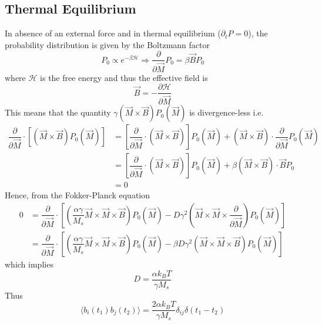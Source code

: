 \documentclass[aps,prb,onecolumn,notitlepage,showpacs,floatfix,superscriptaddress]{revtex4-1}
\begin{document}
\subsection*{Thermal Equilibrium}
In absence of an external force and in thermal equilibrium ($\partial_t P = 0$), the probability distribution is given by the Boltzmann factor
\begin{equation}
P_0 \propto e^{-\beta \mathcal{H}} \Rightarrow \dfrac{\partial}{\partial \vec{M}} P_0 = \beta \vec{B} P_0
\end{equation}
where $\mathcal{H}$ is the free energy and thus the effective field is 
\begin{equation}
\vec{B} = - \dfrac{\partial \mathcal{H}}{\partial \vec{M}}
\end{equation}
This means that the quantity $\gamma (\vec{M} \times \vec{B}) P_0(\vec{M})$ is divergence-less i.e.
\begin{equation}
\begin{split}
\dfrac{\partial}{\partial \vec{M}} \cdot\left[ (\vec{M} \times \vec{B}) P_0(\vec{M}) \right] &=  \left[ \dfrac{\partial}{\partial \vec{M}} \cdot(\vec{M} \times \vec{B}) \right] P_0(\vec{M}) + (\vec{M} \times \vec{B}) \cdot \dfrac{\partial}{\partial \vec{M}} P_0 (\vec{M}) \\
&=  \left[ \dfrac{\partial}{\partial \vec{M}} \cdot(\vec{M} \times \vec{B}) \right] P_0(\vec{M}) + \beta (\vec{M} \times \vec{B}) \cdot  \vec{B} P_0 \\
&=0
\end{split}
\end{equation}
Hence, from the Fokker-Planck equation
\begin{equation}
\begin{split}
0 &= \dfrac{\partial}{\partial \vec{M}} \cdot \left[\left( \dfrac{\alpha \gamma}{M_s} \vec{M} \times \vec{M} \times \vec{B}\right) P_0(\vec{M}) - D \gamma^2 \left(\vec{M} \times \vec{M} \times \dfrac{\partial}{\partial \vec{M}} \right) P_0(\vec{M}) \right]  \\
&= \dfrac{\partial}{\partial \vec{M}} \cdot \left[\left( \dfrac{\alpha \gamma}{M_s} \vec{M} \times \vec{M} \times \vec{B}\right) P_0(\vec{M}) - \beta D \gamma^2 \left(\vec{M} \times \vec{M} \times \vec{B} \right) P_0(\vec{M}) \right]  
 \end{split}
\end{equation}
which implies 
\begin{equation}
D=\dfrac{\alpha k_B T }{\gamma M_s}
\end{equation}
Thus
\begin{equation}
\langle b_i(t_1) b_j(t_2) \rangle = \dfrac{2 \alpha k_B T }{\gamma M_s} \delta_{ij} \delta(t_1-t_2)
\end{equation}
\end{document}
